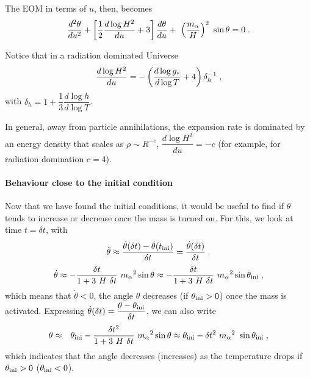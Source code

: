 \documentclass[11pt,a4paper]{article}
\begin{document}
The EOM in terms of $u$, then, becomes
%
\begin{equation}
	\dfrac{d^2  \theta}{du^2} + \left[ \dfrac{1}{2} \dfrac{d \log H^2}{du} + 3  \right] \dfrac{d  \theta}{d u} + \ \left( \dfrac{m_\alpha{}}{H} \right)^2 \ \sin \theta
	=0 \;.
	\label{eq:eom_u}
\end{equation}

Notice that in a radiation dominated Universe
%
$$
\dfrac{d \log H^2}{du} = -\left(  \dfrac{d \log g_*}{d \log T} +4  \right) \delta_h^{-1}\;,
$$
with  $ \delta_h = 1+ \dfrac{1}{3} \dfrac{d \log h}{d \log T} $.%

In general, away from particle annihilations, the expansion rate is dominated by an energy density that scales as $\rho \sim R^{-c}$, \ie $\dfrac{d \log H^2}{du}  = -c$ (for example, for radiation domination $c=4$). 


\paragraph{Behaviour close to the initial condition}
%
Now that we have found the initial conditions, it would be useful to find if $\theta$ tends to increase or decrease once the mass is turned on. For this, we look at time $t = \delta t$, with 
%
\begin{equation*}
	\ddot{\theta} \approx \dfrac{\dot \theta (\delta t)  - \dot \theta (t_{\rm ini}{})}{ \delta  t } =  \dfrac{\dot \theta (\delta t)  }{\delta  t } \;.
\end{equation*} 
%
\begin{equation*}
	\dot{\theta} \approx  - \dfrac{\delta t}{1+3 \ H \ \delta t} \  \ma^2  \sin \theta  \approx  - \dfrac{\delta t}{1+3 \ H \ \delta t} \  \ma^2  \sin \thetai\;,
\end{equation*} 
%
which means that $\dot\theta<0$, \ie the angle $\theta$ decreases (if $\theta_{\rm ini}{}>0$) once the mass is activated. Expressing $\dot \theta(\delta t) = \dfrac{\theta - \theta_{\rm ini}{}}{\delta t}$, we can also write
%
\begin{eqnarray}
	\theta & \approx & \thetai -\dfrac{\delta t^2}{1+3 \ H \ \delta t} \  \ma^2  \sin \theta  
	\approx   \thetai - \delta t^2 \ \ma^2 \ \sin \thetai \;, 
	\label{eq:theta_dt}
\end{eqnarray}
%
which indicates that the angle decreases (increases) as the temperature drops if $\theta_{\rm ini}{}>0$ ($\theta_{\rm ini}{}<0$).
\end{document}
